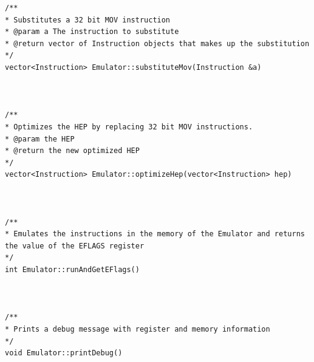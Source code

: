 \documentclass[11pt,twoside]{eitExjobb}
\begin{document}
\begin{Verbatim}[fontsize=\tiny]
/**
* Substitutes a 32 bit MOV instruction
* @param a The instruction to substitute
* @return vector of Instruction objects that makes up the substitution
*/
vector<Instruction> Emulator::substituteMov(Instruction &a)



/**
* Optimizes the HEP by replacing 32 bit MOV instructions. 
* @param the HEP
* @return the new optimized HEP
*/
vector<Instruction> Emulator::optimizeHep(vector<Instruction> hep)



/**
* Emulates the instructions in the memory of the Emulator and returns the value of the EFLAGS register
*/
int Emulator::runAndGetEFlags() 



/**
* Prints a debug message with register and memory information
*/
void Emulator::printDebug()
\end{Verbatim}
\end{document}
